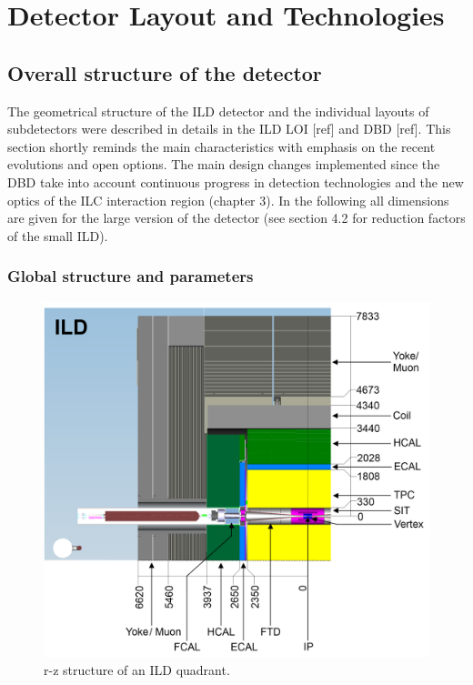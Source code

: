 
\chapter{Detector Layout and Technologies}




\section{Overall structure of the detector}

The geometrical structure of the ILD detector and the individual layouts of subdetectors were described in details in the ILD LOI [ref] and DBD [ref]. This section shortly reminds the main characteristics with emphasis on the recent evolutions and open options. The main design changes implemented since the DBD take into account continuous progress in detection technologies and the new optics of the ILC interaction region (chapter 3). In the following all dimensions are given for the large version of the detector (see section 4.2 for reduction factors of the small ILD).

\vspace{2cm}

\subsection{Global structure and parameters}


\begin{figure}[t!]
\centering
\includegraphics[width=0.6\hsize]{Detector/fig/ILD_quadrant_2.png}
\caption{r-z structure of an ILD quadrant.}
\label{fig:det:quad}
\end{figure}

